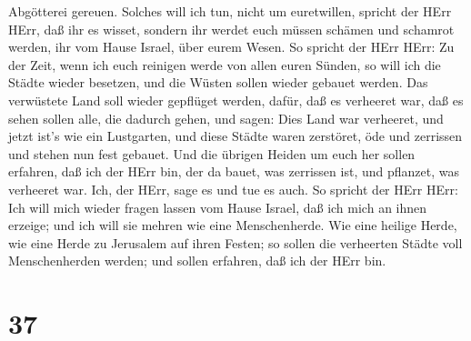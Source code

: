 Abgötterei gereuen.  Solches will ich tun, nicht um
euretwillen, spricht der HErr HErr, daß ihr es wisset, sondern ihr
werdet euch müssen schämen und schamrot werden, ihr vom Hause Israel,
über eurem Wesen.  So spricht der HErr HErr: Zu der Zeit,
wenn ich euch reinigen werde von allen euren Sünden, so will ich die
Städte wieder besetzen, und die Wüsten sollen wieder gebauet werden.
 Das verwüstete Land soll wieder gepflüget werden, dafür,
daß es verheeret war, daß es sehen sollen alle, die dadurch gehen,
 und sagen: Dies Land war verheeret, und jetzt ist's wie
ein Lustgarten, und diese Städte waren zerstöret, öde und zerrissen und
stehen nun fest gebauet.  Und die übrigen Heiden um euch
her sollen erfahren, daß ich der HErr bin, der da bauet, was zerrissen
ist, und pflanzet, was verheeret war. Ich, der HErr, sage es und tue es
auch.  So spricht der HErr HErr: Ich will mich wieder
fragen lassen vom Hause Israel, daß ich mich an ihnen erzeige; und ich
will sie mehren wie eine Menschenherde.  Wie eine heilige
Herde, wie eine Herde zu Jerusalem auf ihren Festen; so sollen die
verheerten Städte voll Menschenherden werden; und sollen erfahren, daß
ich der HErr bin.

\hypertarget{section-36}{%
\section{37}\label{section-36}}

